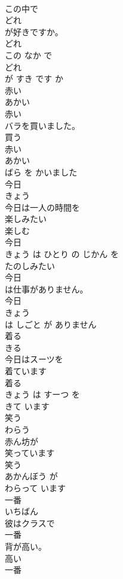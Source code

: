 \documentclass[8pt]{extreport}
\begin{document}
\begin{CJK}{UTF8}{min}
\\	この中で
\\	どれ
\\	が好きですか。	
\\	どれ 
\\	この なか で 
\\	どれ
\\	が すき です か	
\\	赤い	
\\	あかい	
\\	赤い
\\	バラを買いました。	
\\	買う 
\\	赤い 
\\	あかい
\\	ばら を かいました	
\\	今日	
\\	きょう	
\\	今日は一人の時間を
\\	楽しみたい
\\	楽しむ 
\\	今日 
\\	きょう は ひとり の じかん を 
\\	たのしみたい
\\	今日
\\	は仕事がありません。	
\\	今日 
\\	きょう
\\	は しごと が ありません	
\\	着る	
\\	きる	
\\	今日はスーツを
\\	着ています
\\	着る 
\\	きょう は すーつ を 
\\	きて います
\\	笑う	
\\	わらう	
\\	赤ん坊が
\\	笑っています
\\	笑う 
\\	あかんぼう が 
\\	わらって います
\\	一番	
\\	いちばん	
\\	彼はクラスで
\\	一番
\\	背が高い。	
\\	高い 
\\	一番 

\end{CJK}
\end{document}
